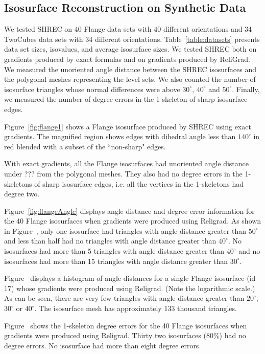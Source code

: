 \subsection{Isosurface Reconstruction on Synthetic Data}

We tested SHREC on 40 Flange data sets with 40 different orientations
and 34 TwoCubes data sets with 34 different orientations.
Table~\ref{table:datasets} presents data set sizes, isovalues,
and average isosurface sizes.
We tested SHREC both on gradients produced by exact formulas 
and on gradients produced by ReliGrad.
We measured the unoriented angle distance between the SHREC isosurfaces
and the polygonal meshes representing the level sets.
We also counted the number of isosurface triangles whose normal differences
were above $30^\circ$, $40^\circ$ and $50^\circ$.
Finally, we measured the number of degree errors 
in the 1-skeleton of sharp isosurface edges.

Figure~\ref{fig:flange1} shows a Flange isosurface produced by SHREC
using exact gradients.
The magnified region shows edges with dihedral angle
less than $140^\circ$ in red blended with a subset of the ``non-sharp"
edges.

With exact gradients,
all the Flange isosurfaces had unoriented angle distance
under ??? from the polygonal meshes.
They also had no degree errors in the 1-skeletons
of sharp isosurface edges,
i.e. all the vertices in the 1-skeletons had degree two.

Figure~\ref{fig:flangeAngle} displays angle distance and degree error
information for the 40 Flange isosurfaces
when gradients were produced using Religrad.
As shown in Figure~,
only one isosurface had triangles with angle distance greater than $50^\circ$
and less than half had no triangles with angle distance greater than $40^\circ$.
No isosurfaces had more than 5 triangles with angle distance
greater than $40^\circ$
and no isosurfaces had more than 15 triangles with angle distance greater
than $30^\circ$.

Figure~ displays a histogram of angle distances
for a single Flange isosurface (id 17) 
whose gradients were produced using Religrad.
(Note the logarithmic scale.)
As can be seen,
there are very few triangles with angle distance
greater than $20^\circ$, $30^\circ$ or $40^\circ$.
The isosurface mesh has approximately 133
thousand triangles. 

Figure~\protect{} shows the 1-skeleton degree errors
for the 40 Flange isosurfaces when gradients were produced using Religrad.
Thirty two isosurfaces (80$\%$) had no degree errors.
No isosurface had more than eight degree errors.

